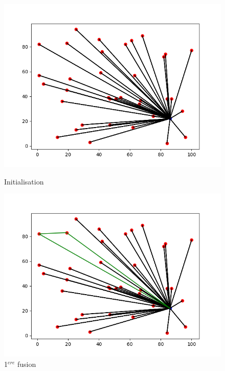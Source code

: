 \documentclass[a4paper,11pt]{article}%
\begin{document}
\begin{figure}
    \begin{minipage}[c]{.46\linewidth}
        \centering
  	\includegraphics[scale=0.4]{CWinit.png}
  	\caption{Initialisation}
	\label{CWinit}
    \end{minipage}
    \hfill%
    \begin{minipage}[c]{.46\linewidth}
        \centering
	\includegraphics[scale=0.4]{CW1.png}
	\caption{1$^{ere}$ fusion}
 	\label{CW1}
    \end{minipage}


\end{figure}
\end{document}
